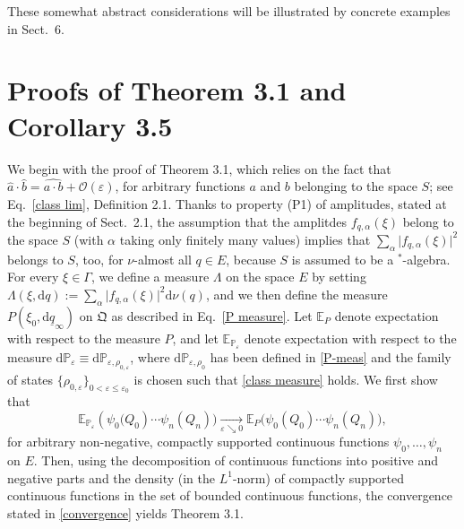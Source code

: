 \documentclass[12pt]{article}
\begin{document}
\vspace{0.2cm}These somewhat abstract considerations will be illustrated by concrete examples in Sect.~6.

\section{Proofs of Theorem 3.1 and Corollary 3.5}
We begin with the proof of Theorem 3.1, which relies on the fact that 
$\widehat{a}\cdot \widehat{b}= \widehat{a\cdot b} + \mathcal{O}(\varepsilon)$, for arbitrary functions $a$ and $b$ 
belonging to the space $S$; see Eq.~\eqref{class lim}, Definition 2.1. Thanks to property (P1) of amplitudes, stated at the beginning 
of Sect.~2.1, the assumption that the amplitdes $f_{q, \alpha}(\xi)$ belong to the space $S$ (with $\alpha$ taking only 
finitely many values) implies that $\sum_{\alpha} \vert f_{q,\alpha}(\xi)\vert^{2}$ belongs to $S$, too, for $\nu$-almost 
all $q\in E$, because $S$ is assumed to be a $^{*}$-algebra. For every $\xi \in \Gamma$, we define a measure 
$\Lambda$ on the space $E$ by setting
$\Lambda(\xi, \text{d}q):= \sum_{\alpha} \vert f_{q,\alpha}(\xi)\vert^{2} \text{d}\nu(q)$, and we then define the
measure $P(\xi_0, \text{d}\underline{q}_{\infty})$ on $\mathfrak{Q}$ as described 
in Eq.~\eqref{P measure}.
Let $\mathbb{E}_{P}$ denote expectation with respect to the measure $P$, and let 
$\mathbb{E}_{\mathbb{P}_{\varepsilon}}$ denote expectation with respect to the measure 
$\text{d}\mathbb{P}_{\varepsilon}\equiv \text{d}\mathbb{P}_{\varepsilon, \rho_{0, \varepsilon}}$, where 
$\text{d}\mathbb{P}_{\varepsilon, \rho_{0}}$ has been defined in \eqref{P-meas} and the family of states 
$\big\{\rho_{0, \varepsilon}\big\}_{0<\varepsilon \leq \varepsilon_0}$ is chosen such that \eqref{class measure} holds.
We first show that
\begin{equation}\label{convergence}
\mathbb{E}_{\mathbb{P}_{\varepsilon}}(\psi_{0}\big(Q_0) \cdots \psi_{n}(Q_n)\big) 
\underset{\varepsilon \searrow 0}{\rightarrow} \mathbb{E}_{P}\big(\psi_{0}(Q_0) \cdots \psi_{n}(Q_n)\big),
\end{equation}
for arbitrary non-negative, compactly supported continuous functions $\psi_0, \dots, \psi_n$ on $E$. Then, using 
the decomposition of continuous functions into positive and negative parts and the density (in the $L^1$-norm) 
of compactly supported continuous functions in the set of bounded continuous functions, the convergence 
stated in \eqref{convergence} yields Theorem 3.1.
\end{document}
